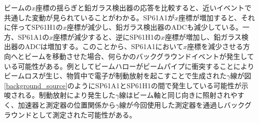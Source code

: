 ビームの$x$座標の揺らぎと鉛ガラス検出器の応答を比較すると、近いイベントで共通した変動が見られていることがわかる。SP61A1が$x$座標が増加すると、それに伴ってSP61H1の$x$座標が減少し、鉛ガラス検出器のADCも減少している。一方、SP61A1の$x$座標が減少すると、逆にSP61H1の$x$座標が増加し、鉛ガラス検出器のADCは増加する。このことから、SP61A1において$x$座標を減少させる方向へとビームを移動させた場合、何らかのバックグラウンドイベントが発生している可能性がある。例としてビームハローがビームパイプに衝突することによりビームロスが生じ、物質中で電子が制動放射を起こすことで生成された$\gamma$線が図\ref{background_source}のようにSP61A1とSP61H1の間で発生している可能性が示唆される。制動放射により発生した$\gamma$線はビーム軸と同じ向きに照射されやすく、加速器と測定器の位置関係から$\gamma$線が今回使用した測定器を通過しバックグラウンドとして測定された可能性がある。

